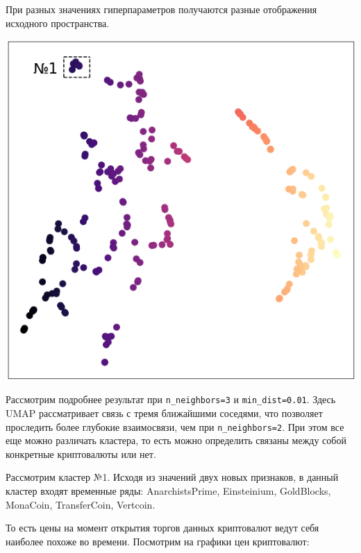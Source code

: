 \graphicspath{{chapters/cryptocurrency/}}
При разных значениях гиперпараметров получаются разные отображения исходного пространства.

\begin{multicols}{2}
	\includegraphics[width=0.85\linewidth]{show.png}\columnbreak
	
	Рассмотрим подробнее результат при \verb|n_neighbors=3| и \verb|min_dist=0.01|. Здесь UMAP рассматривает связь с тремя ближайшими соседями, что позволяет проследить более глубокие взаимосвязи, чем при \verb|n_neighbors=2|. При этом все еще можно различать кластера, то есть можно определить связаны между собой конкретные криптовалюты или нет.
	
	Рассмотрим кластер №1. Исходя из значений двух новых признаков, в данный кластер входят временные ряды: AnarchistsPrime, Einsteinium, GoldBlocks, MonaCoin, TransferCoin, Vertcoin.
\end{multicols}

То есть цены на момент открытия торгов данных криптовалют ведут себя наиболее похоже во времени. Посмотрим на графики цен криптовалют:

\begin{figure}[H]
	\noindent {}
\end{figure}

